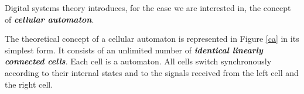
Digital systems theory introduces, for the case we are interested in, the concept of {\bf {\em cellular automaton}}.


The theoretical concept of a cellular automaton is represented in Figure \ref{ca} in its simplest form. It consists of an unlimited number of {\bf {\em identical linearly connected cells}}. Each cell is a automaton. All cells switch synchronously according to their internal states and to the signals received from the left cell and the right cell.

